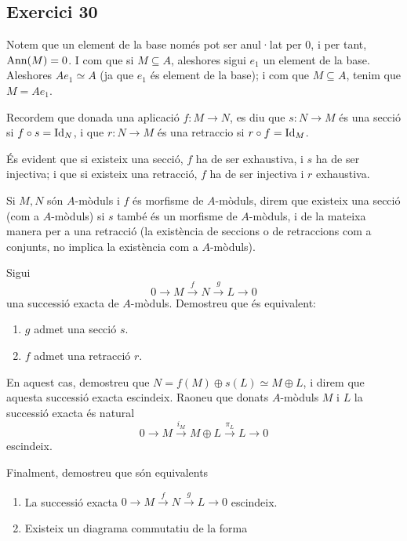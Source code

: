 \documentclass[11pt, a4paper]{article}
\begin{document}
\subsection{Exercici 30}
Notem que un element de la base només pot ser anul·lat per 0, i per tant, $\mathrm{Ann}(M)=0$. I com que si $M\subseteq A$, aleshores sigui $e_1$ un element de la base. Aleshores $Ae_1\simeq A$ (ja que $e_1$ és element de la base); i com que $M\subseteq A$, tenim que $M=Ae_1$.
\newpage
\begin{tcolorbox}[title=\section{Exercici 34}]
Recordem que donada una aplicació $f: M\to N$, es diu que $s: N\to M$ és una secció si $f \circ s = \mathrm{Id}_N$, i que $r: N\to M$ és una retraccio si $r\circ f= \mathrm{Id}_M$.\par
És evident que si existeix una secció, $f$ ha de ser exhaustiva, i $s$ ha de ser injectiva; i que si existeix una retracció, $f$ ha de ser injectiva i $r$ exhaustiva.\par
Si $M,N$ són $A$-mòduls i $f$ és morfisme de $A$-mòduls, direm que existeix una secció (com a $A$-mòduls) si $s$ també és un morfisme de $A$-mòduls, i de la mateixa manera per a una retracció (la existència de seccions o de retraccions com a conjunts, no implica la existència com a $A$-mòduls).\par
Sigui 
\[
    0\to M \xrightarrow{f} N \xrightarrow{g} L \to 0
\]
una successió exacta de $A$-mòduls. Demostreu que és equivalent:
\begin{enumerate}
    \item $g$ admet una secció $s$.
    \item $f$ admet una retracció $r$.
\end{enumerate}
En aquest cas, demostreu que $N=f(M)\oplus s(L)\simeq M\oplus L$, i direm que aquesta successió exacta escindeix. Raoneu que donats $A$-mòduls $M$ i $L$ la successió exacta és natural
\[
0\to M\xrightarrow{i _M} M\oplus L \xrightarrow{\pi_L} L\to 0
\]
escindeix.\par
Finalment, demostreu que són equivalents
\begin{enumerate}
    \item La successió exacta $0\to M\xrightarrow{f} N\xrightarrow{g} L\to 0$ escindeix.
    \item Existeix un diagrama commutatiu de la forma
\begin{center} 
\end{center}
\end{enumerate}
\end{tcolorbox}
\end{document}
